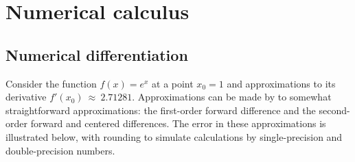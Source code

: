 \documentclass[11pt]{article}
\begin{document}
\clearpage
\section{Numerical calculus}
\subsection{Numerical differentiation}
Consider the function \(f(x) = e^x\) at a point \(x_0=1\) and approximations to its derivative \(f'(x_0)~\approx~ 2.71281\). Approximations can be made by to somewhat straightforward approximations: the first-order forward difference and the second-order forward and centered differences. The error in these approximations is illustrated below, with rounding to simulate calculations by single-precision and double-precision numbers.
\end{document}

